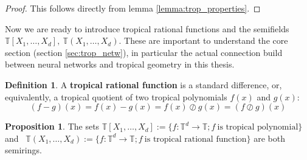 \documentclass{article}
\theoremstyle{definition}
\newtheorem{definition}[theorem]{Definition}
\newtheorem{proposition}[theorem]{Proposition}
\begin{document}
\begin{proof}
This follows directly from lemma \ref{lemma:trop_properties}.
\end{proof}

Now we are ready to introduce tropical rational functions and the semifields $\mathbb{T}[X_{1} , \dots , X_{d}], \ \mathbb{T}(X_{1} , \dots , X_{d})$. These are important to understand the core section (section \ref{sec:trop_netw}), in particular the actual connection build between neural networks and tropical geometry in this thesis.

\begin{definition} \cite[p.~3]{zhang2018tropical}
A \textbf{tropical rational function} is a standard difference, or, equivalently, a tropical quotient of two tropical polynomials $f(x)$ and $g(x)$:
$$ (f-g)(x) = f(x) - g(x) = f(x) \oslash g(x) = (f \oslash g)(x)$$
\end{definition}
\begin{proposition}
\label{prop:trop_semi_ring_set}
The sets $\mathbb{T}[X_1, \dots , X_d] := \{ f: \mathbb{T}^{d} \to \mathbb{T} ; f \ \text{is tropical polynomial} \}$ and \ $ \mathbb{T}(X_1, \dots , X_d) := \{ f: \mathbb{T}^{d} \to \mathbb{T} ; f \ \text{is tropical rational function} \}$ are both semirings. \cite[p.~3]{zhang2018tropical}
\end{proposition}
\end{document}
